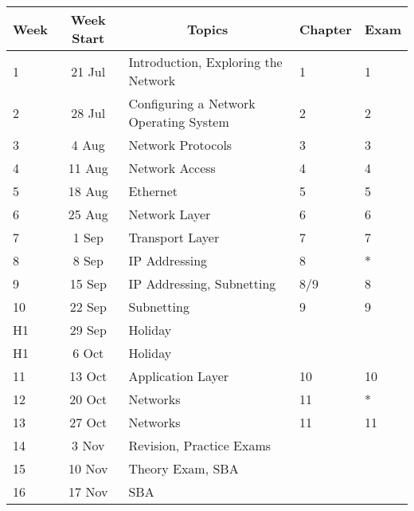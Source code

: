 \documentclass{article}
\begin{document}
\renewcommand{\arraystretch}{1.5}
\begin{tabular}{|l|c|l|l|l|}
\hline
 Week & Week Start & \multicolumn{1}{c|}{Topics}                   & Chapter & Exam \\ \hline
 1    & 21 Jul     & Introduction, Exploring the Network           &  1      &  1 \\ \hline
 2    & 28 Jul     & Configuring a Network Operating System        &  2      &  2 \\ \hline
 3    &  4 Aug     & Network Protocols                             &  3      &  3 \\ \hline
 4    & 11 Aug     & Network Access                                &  4      &  4  \\ \hline
 5    & 18 Aug     & Ethernet                                      &  5      &  5 \\ \hline
 6    & 25 Aug     & Network Layer                                 &  6      &  6 \\ \hline
 7    &  1 Sep     & Transport Layer                               &  7      &  7 \\ \hline
 8    &  8 Sep     & IP Addressing                                 &  8      &  * \\ \hline
 9    & 15 Sep     & IP Addressing, Subnetting                     &  8/9    &  8 \\ \hline
 10   & 22 Sep     & Subnetting                                    &  9      &  9 \\ \hline
 H1   & 29 Sep     & Holiday                                       &         &    \\ \hline
 H1   &  6 Oct     & Holiday                                       &         &    \\ \hline
 11   & 13 Oct     & Application Layer                             &  10     &  10 \\ \hline
 12   & 20 Oct     & Networks                                      &  11     &  *  \\ \hline
 13   & 27 Oct     & Networks                                      &  11     &  11 \\ \hline
 14   &  3 Nov     & Revision, Practice Exams                      &         &     \\ \hline
 15   & 10 Nov     & Theory Exam, SBA                              &         &  \\ \hline
 16   & 17 Nov     & SBA                                           &         &  \\ \hline
\end{tabular}
\end{document}
